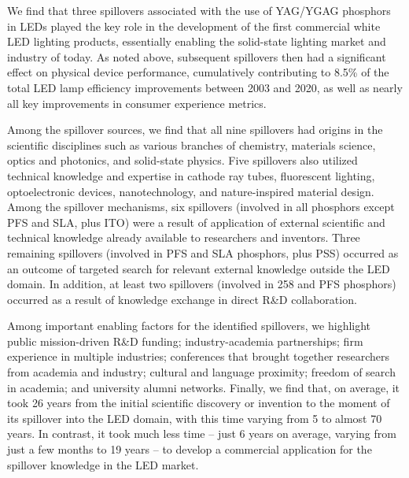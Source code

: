 \documentclass[parskip=full]{article}
\begin{document}
We find that three spillovers associated with the use of YAG/YGAG phosphors in LEDs played the key role in the development of the first commercial white LED lighting products, essentially enabling the solid-state lighting market and industry of today. As noted above, subsequent spillovers then had a significant effect on physical device performance, cumulatively contributing to 8.5\% of the total LED lamp efficiency improvements between 2003 and 2020, as well as nearly all key improvements in consumer experience metrics.

Among the spillover sources, we find that all nine spillovers had origins in the scientific disciplines such as various branches of chemistry, materials science, optics and photonics, and solid-state physics. Five spillovers also utilized technical knowledge and expertise in cathode ray tubes, fluorescent lighting, optoelectronic devices, nanotechnology, and nature-inspired material design.
Among the spillover mechanisms, six spillovers (involved in all phosphors except PFS and SLA, plus ITO) were a result of application of external scientific and technical knowledge already available to researchers and inventors. Three remaining spillovers (involved in PFS and SLA phosphors, plus PSS) occurred as an outcome of targeted search for relevant external knowledge outside the LED domain. In addition, at least two spillovers (involved in 258 and PFS phosphors) occurred as a result of knowledge exchange in direct R\&D collaboration.

Among important enabling factors for the identified spillovers, we highlight public mission-driven R\&D funding; industry-academia partnerships; firm experience in multiple industries; conferences that brought together researchers from academia and industry; cultural and language proximity; freedom of search in academia; and university alumni networks.
Finally, we find that, on average, it took 26 years from the initial scientific discovery or invention to the moment of its spillover into the LED domain, with this time varying from 5 to almost 70 years. In contrast, it took much less time – just 6 years on average, varying from just a few months to 19 years – to develop a commercial application for the spillover knowledge in the LED market.
\end{document}
